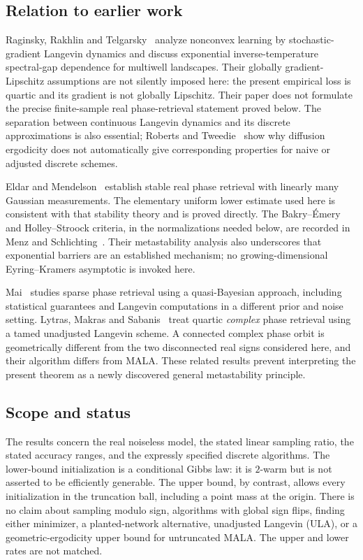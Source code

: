 \documentclass[11pt,letterpaper]{article}
\numberwithin{equation}{section}
\theoremstyle{remark}
\newcommand{\1}{\mathbf 1}
\begin{document}
\subsection{Relation to earlier work}

Raginsky, Rakhlin and Telgarsky~\cite{RRT} analyze nonconvex learning by stochastic-gradient Langevin dynamics and discuss exponential inverse-temperature spectral-gap dependence for multiwell landscapes. Their globally gradient-Lipschitz assumptions are not silently imposed here: the present empirical loss is quartic and its gradient is not globally Lipschitz. Their paper does not formulate the precise finite-sample real phase-retrieval statement proved below. The separation between continuous Langevin dynamics and its discrete approximations is also essential; Roberts and Tweedie~\cite{RT} show why diffusion ergodicity does not automatically give corresponding properties for naive or adjusted discrete schemes.

Eldar and Mendelson~\cite{EM} establish stable real phase retrieval with linearly many Gaussian measurements. The elementary uniform lower estimate used here is consistent with that stability theory and is proved directly. The Bakry--\'Emery and Holley--Stroock criteria, in the normalizations needed below, are recorded in Menz and Schlichting~\cite[Theorems 3.1--3.2]{MS}. Their metastability analysis also underscores that exponential barriers are an established mechanism; no growing-dimensional Eyring--Kramers asymptotic is invoked here.

Mai~\cite{Mai} studies sparse phase retrieval using a quasi-Bayesian approach, including statistical guarantees and Langevin computations in a different prior and noise setting. Lytras, Makras and Sabanis~\cite[Section 8.2]{LMS} treat quartic \emph{complex} phase retrieval using a tamed unadjusted Langevin scheme. A connected complex phase orbit is geometrically different from the two disconnected real signs considered here, and their algorithm differs from MALA. These related results prevent interpreting the present theorem as a newly discovered general metastability principle.

\subsection{Scope and status}

The results concern the real noiseless model, the stated linear sampling ratio, the stated accuracy ranges, and the expressly specified discrete algorithms. The lower-bound initialization is a conditional Gibbs law: it is $2$-warm but is not asserted to be efficiently generable. The upper bound, by contrast, allows every initialization in the truncation ball, including a point mass at the origin. There is no claim about sampling modulo sign, algorithms with global sign flips, finding either minimizer, a planted-network alternative, unadjusted Langevin (ULA), or a geometric-ergodicity upper bound for untruncated MALA. The upper and lower rates are not matched.
\end{document}
